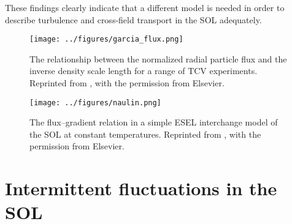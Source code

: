 These findings clearly indicate that a different model is needed in order to describe
turbulence and cross-field transport in the SOL adequately.
\begin{figure}
  \centering
  \begin{minipage}{.48\linewidth}
    \texttt{[image: ../figures/garcia\_flux.png]}

    \caption{The relationship between the normalized radial particle flux and the inverse density scale length for a range of TCV experiments. Reprinted from \cite{garcia2007turbulent}, with the permission from Elsevier.}
    \label{Fig:garcia_flux}
  \end{minipage}
  \hfill
  \begin{minipage}{.48\linewidth}
    \texttt{[image: ../figures/naulin.png]}
    \caption{The ﬂux–gradient relation in a simple ESEL interchange model of the SOL at constant temperatures. Reprinted from \cite{naulin2007turbulent}, with the permission from Elsevier.}
    \label{Fig:naulin}
  \end{minipage}
\end{figure}

\section{Intermittent fluctuations in the SOL}

